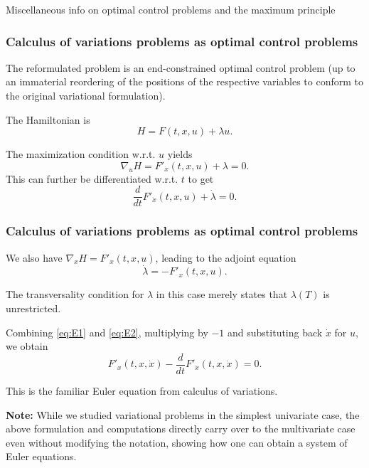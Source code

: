 \documentclass[10pt]{beamer}
\theoremstyle{definition}
\begin{document}
\begin{section}{Miscellaneous info on optimal control problems and the maximum principle}
\begin{frame}[fragile]
\frametitle{Calculus of variations problems as optimal control problems}
The reformulated problem is an end-constrained optimal control problem (up to an immaterial reordering of the positions of the respective variables to conform to the original variational formulation).

The Hamiltonian is \[ H=F(t,x,u)+\lambda u. \]

The maximization condition w.r.t. $ u $ yields \[ \nabla_u H = F'_{\dot{x}}(t,x,u)+\lambda = 0. \]
This can further be differentiated w.r.t. $ t $ to get \begin{equation}\label{eq:E1}
\frac{d}{dt}F'_{\dot{x}}(t,x,u)+\dot{\lambda} = 0.\tag{$ \star $}
\end{equation} 
\end{frame}

\begin{frame}[fragile]
\frametitle{Calculus of variations problems as optimal control problems}
We also have $ \nabla_x H = F'_x(t,x,u) $, leading to the adjoint equation \begin{equation}\label{eq:E2}
\dot{\lambda} = -F'_x(t,x,u).\tag{$ \star \star$}
\end{equation}  

The transversality condition for $ \lambda $ in this case merely states that $ \lambda(T) $ is unrestricted.

Combining \eqref{eq:E1} and \eqref{eq:E2}, multiplying by $ -1 $ and substituting back $ \dot{x} $ for $ u $, we obtain \[ F'_x(t,x,\dot{x})-\frac{d}{dt}F'_{\dot{x}}(t,x,\dot{x}) = 0. \]

This is the familiar Euler equation from calculus of variations.\bigskip

\textbf{Note:} While we studied variational problems in the simplest univariate case, the above formulation and computations directly carry over to the multivariate case even without modifying the notation, showing how one can obtain a system of Euler equations.
\end{frame}

\end{section}


%
\end{document}
